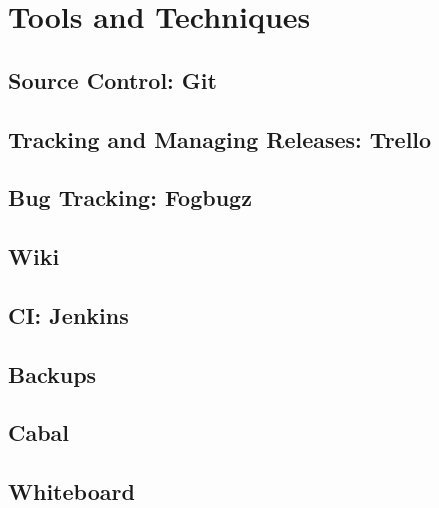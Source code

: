 \section{Tools and Techniques}

\subsection{Source Control: Git}

\subsection{Tracking and Managing Releases: Trello}

\subsection{Bug Tracking: Fogbugz}

\subsection{Wiki}

\subsection{CI: Jenkins}

\subsection{Backups}

\subsection{Cabal}

\subsection{Whiteboard}
